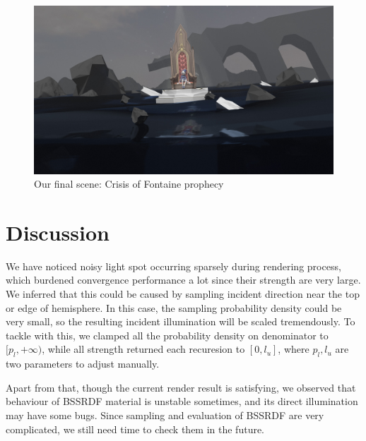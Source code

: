 \documentclass[acmtog]{acmart}
\begin{document}
\begin{figure}[h]
	\centering	
	\includegraphics[width=\linewidth]{my_scene}
	\caption{Our final scene: Crisis of Fontaine prophecy}
	\label{my_scene}
\end{figure}

\section{Discussion}

We have noticed noisy light spot occurring sparsely during rendering process, which burdened convergence performance a lot since their strength are very large. We inferred that this could be caused by sampling incident direction near the top or edge of hemisphere. In this case, the sampling probability density could be very small, so the resulting incident illumination will be scaled tremendously. To tackle with this, we clamped all the probability density on denominator to $[p_l, +\infty)$, while all strength returned each recuresion to $[0, l_u]$, where $p_l, l_u$ are two parameters to adjust manually.

Apart from that, though the current render result is satisfying, we observed that behaviour of BSSRDF material is unstable sometimes, and its direct illumination may have some bugs. Since sampling and evaluation of BSSRDF are very complicated, we still need time to check them in the future.   



\end{document}
